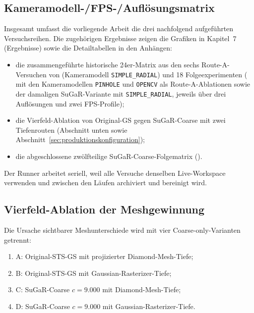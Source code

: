 \subsection{Kameramodell-/FPS-/Auflösungsmatrix}

Insgesamt umfasst die vorliegende Arbeit die drei nachfolgend aufgeführten Versuchsreihen. Die zugehörigen Ergebnisse
zeigen die Grafiken in Kapitel~7 (Ergebnisse) sowie die Detailtabellen in den
Anhängen:

\begin{itemize}
  \item die zusammengeführte historische 24er-Matrix aus den sechs
        Route-A-Versuchen von  (Kameramodell
        \texttt{SIMPLE\_RADIAL}) und 18
        Folgeexperimenten ( mit den Kameramodellen
        \texttt{PINHOLE} und \texttt{OPENCV} als Route-A-Ablationen sowie der
        damaligen SuGaR-Variante mit \texttt{SIMPLE\_RADIAL}, jeweils über
        drei Auflösungen und zwei FPS-Profile);
  \item die Vierfeld-Ablation von Original-GS gegen SuGaR-Coarse mit zwei
        Tiefenrouten (Abschnitt unten sowie
        Abschnitt~\ref{sec:produktionskonfiguration});
  \item die abgeschlossene zwölfteilige SuGaR-Coarse-Folgematrix
        ().
\end{itemize}

Der Runner arbeitet seriell, weil alle Versuche denselben
Live-Workspace verwenden und zwischen den Läufen archiviert und bereinigt
wird.

\subsection{Vierfeld-Ablation der Meshgewinnung}
\label{subsec:vierfeld-ablation}

Die Ursache sichtbarer Meshunterschiede wird mit vier Coarse-only-Varianten
getrennt:

\begin{enumerate}
  \item A: Original-STS-GS mit projizierter Diamond-Mesh-Tiefe;
  \item B: Original-STS-GS mit Gaussian-Rasterizer-Tiefe;
  \item C: SuGaR-Coarse $c=9.000$ mit Diamond-Mesh-Tiefe;
  \item D: SuGaR-Coarse $c=9.000$ mit Gaussian-Rasterizer-Tiefe.
\end{enumerate}


